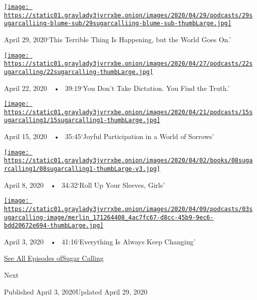 \href{https://www.nytimes3xbfgragh.onion/2020/04/29/podcasts/sugar-calling-judy-blume-quarantine-virus.html?action=click\&module=audio-series-bar\&region=header\&pgtype=Article}{\texttt{[image: https://static01.graylady3jvrrxbe.onion/images/2020/04/29/podcasts/29sugarcalliing-blume-sub/29sugarcalliing-blume-sub-thumbLarge.jpg]}}

April 29, 2020`This Terrible Thing Is Happening, but the World Goes On.'

\href{https://www.nytimes3xbfgragh.onion/2020/04/22/podcasts/sugar-calling-amy-tan-quarantine-virus.html?action=click\&module=audio-series-bar\&region=header\&pgtype=Article}{\texttt{[image: https://static01.graylady3jvrrxbe.onion/images/2020/04/27/podcasts/22sugarcalling/22sugarcalling-thumbLarge.jpg]}}

April 22, 2020~~•~ 39:19`You Don't Take Dictation. You Find the Truth.'

\href{https://www.nytimes3xbfgragh.onion/2020/04/15/podcasts/sugar-calling-pico-iyer-coronavirus.html?action=click\&module=audio-series-bar\&region=header\&pgtype=Article}{\texttt{[image: https://static01.graylady3jvrrxbe.onion/images/2020/04/21/podcasts/15sugarcalling1/15sugarcalling1-thumbLarge.jpg]}}

April 15, 2020~~•~ 35:45`Joyful Participation in a World of Sorrows'

\href{https://www.nytimes3xbfgragh.onion/2020/04/08/podcasts/sugar-calling-margaret-atwood-coronavirus.html?action=click\&module=audio-series-bar\&region=header\&pgtype=Article}{\texttt{[image: https://static01.graylady3jvrrxbe.onion/images/2020/04/02/books/08sugarcalling1/08sugarcalling1-thumbLarge-v3.jpg]}}

April 8, 2020~~•~ 34:32`Roll Up Your Sleeves, Girls'

\href{https://www.nytimes3xbfgragh.onion/2020/04/03/podcasts/sugar-calling-george-saunders-coronavirus.html?action=click\&module=audio-series-bar\&region=header\&pgtype=Article}{\texttt{[image: https://static01.graylady3jvrrxbe.onion/images/2020/04/09/podcasts/03sugarcalling-image/merlin\_171264408\_4ac7fc67-d8cc-45b9-9ec6-bdd20672e694-thumbLarge.jpg]}}

April 3, 2020~~•~ 41:16`Everything Is Always Keep Changing'

\href{https://www.nytimes3xbfgragh.onion/column/sugar-calling}{See All
Episodes ofSugar Calling}

Next

Published April 3, 2020Updated April 29, 2020


